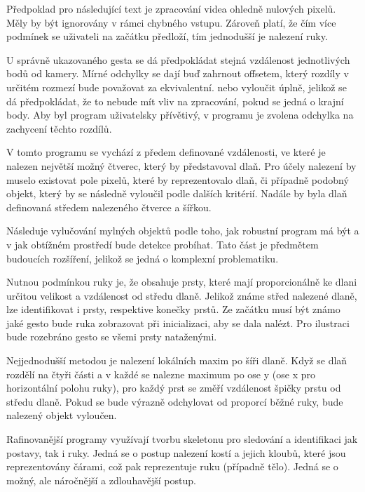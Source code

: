 Předpoklad pro následující text je zpracování videa ohledně nulových pixelů. Měly by být ignorovány v rámci chybného vstupu. Zároveň platí, že čím více podmínek se uživateli na začátku předloží, tím jednodušší je nalezení ruky. 

U správně ukazovaného gesta se dá předpokládat stejná vzdálenost jednotlivých bodů od kamery. Mírné odchylky se dají buď zahrnout offsetem, který rozdíly v určitém rozmezí bude považovat za ekvivalentní. nebo vyloučit úplně, jelikož se dá předpokládat, že to nebude mít vliv na zpracování, pokud se jedná o krajní body. Aby byl program uživatelsky přívětivý, v programu je zvolena odchylka na zachycení těchto rozdílů.

V tomto programu se vychází z předem definované vzdálenosti, ve které je nalezen největší možný čtverec, který by představoval dlaň. Pro účely nalezení by muselo existovat pole pixelů, které by reprezentovalo dlaň, či případně podobný objekt, který by se následně vyloučil podle dalších kritérií. Nadále by byla dlaň definovaná středem nalezeného čtverce a šířkou.

Následuje vylučování mylných objektů podle toho, jak robustní program má být a v jak obtížném prostředí bude detekce probíhat. Tato část je předmětem budoucích rozšíření, jelikož se jedná o komplexní problematiku.

Nutnou podmínkou ruky je, že obsahuje prsty, které mají proporcionálně ke dlani určitou velikost a vzdálenost od středu dlaně. Jelikož známe střed nalezené dlaně, lze identifikovat i prsty, respektive konečky prstů. Ze začátku musí být známo jaké gesto bude ruka zobrazovat při inicializaci, aby se dala nalézt. Pro ilustraci bude rozebráno gesto se všemi prsty nataženými. 

Nejjednodušší metodou je nalezení lokálních maxim po šíři dlaně. Když se dlaň rozdělí na čtyři části a v každé se nalezne maximum po ose y (ose x pro horizontální polohu ruky), pro každý prst se změří vzdálenost špičky prstu od středu dlaně. Pokud se bude výrazně odchylovat od proporcí běžné ruky, bude nalezený objekt vyloučen.

Rafinovanější programy využívají tvorbu skeletonu pro sledování a identifikaci jak postavy, tak i ruky. Jedná se o postup nalezení kostí a jejich kloubů, které jsou reprezentovány čárami, což pak reprezentuje ruku (případně tělo). Jedná se o možný, ale náročnější a zdlouhavější postup.


